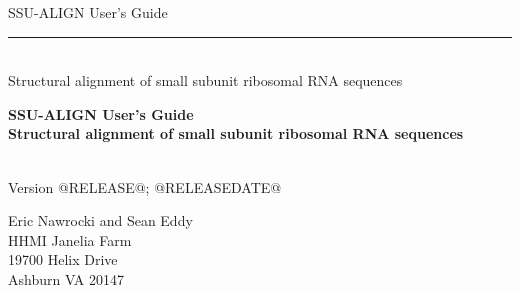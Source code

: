 \begin{titlepage}
{\Large

\vspace*{\fill}

\begin{latexonly}
\noindent
{\Huge \textsf{SSU-ALIGN User's Guide}} \\ 
\rule[2pt]{\textwidth}{1pt} \\
\hspace*{\fill} {\large \textsf{Structural alignment of small subunit
    ribosomal RNA sequences}\\}
\end{latexonly}

\begin{htmlonly}
\begin{center}
{\Huge \textbf{SSU-ALIGN User's Guide}}\\
{\large \textbf{Structural alignment of small subunit ribosomal RNA
    sequences}}\\
\end{center}
\end{htmlonly}

\vspace*{\fill}

\begin{center}
\textsl{}\\
Version @RELEASE@; @RELEASEDATE@ \\ 

\vspace*{\fill}

Eric Nawrocki and Sean Eddy\\
HHMI Janelia Farm\\
19700 Helix Drive\\
Ashburn VA 20147\\
\textsl{} \\
\end{center}

\vspace*{\fill}

}
\end{titlepage}
